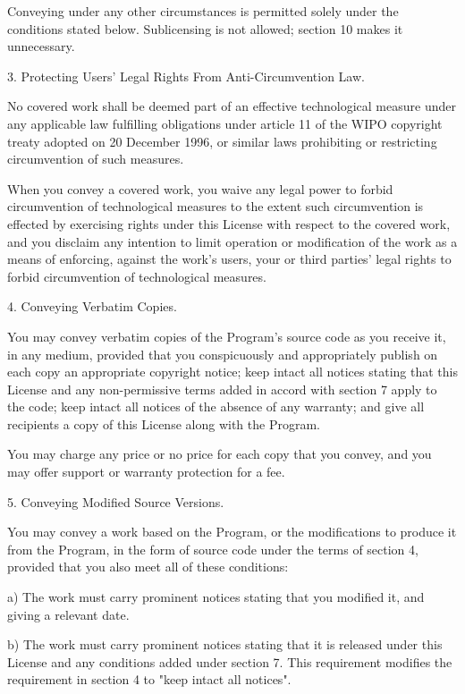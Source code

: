 \documentclass[parskip=half]{scrartcl}
\begin{document}
  Conveying under any other circumstances is permitted solely under
the conditions stated below.  Sublicensing is not allowed; section 10
makes it unnecessary.

  3. Protecting Users' Legal Rights From Anti-Circumvention Law.

  No covered work shall be deemed part of an effective technological
measure under any applicable law fulfilling obligations under article
11 of the WIPO copyright treaty adopted on 20 December 1996, or
similar laws prohibiting or restricting circumvention of such
measures.

  When you convey a covered work, you waive any legal power to forbid
circumvention of technological measures to the extent such circumvention
is effected by exercising rights under this License with respect to
the covered work, and you disclaim any intention to limit operation or
modification of the work as a means of enforcing, against the work's
users, your or third parties' legal rights to forbid circumvention of
technological measures.

  4. Conveying Verbatim Copies.

  You may convey verbatim copies of the Program's source code as you
receive it, in any medium, provided that you conspicuously and
appropriately publish on each copy an appropriate copyright notice;
keep intact all notices stating that this License and any
non-permissive terms added in accord with section 7 apply to the code;
keep intact all notices of the absence of any warranty; and give all
recipients a copy of this License along with the Program.

  You may charge any price or no price for each copy that you convey,
and you may offer support or warranty protection for a fee.

  5. Conveying Modified Source Versions.

  You may convey a work based on the Program, or the modifications to
produce it from the Program, in the form of source code under the
terms of section 4, provided that you also meet all of these conditions:

    a) The work must carry prominent notices stating that you modified
    it, and giving a relevant date.

    b) The work must carry prominent notices stating that it is
    released under this License and any conditions added under section
    7.  This requirement modifies the requirement in section 4 to
    "keep intact all notices".
\end{document}
